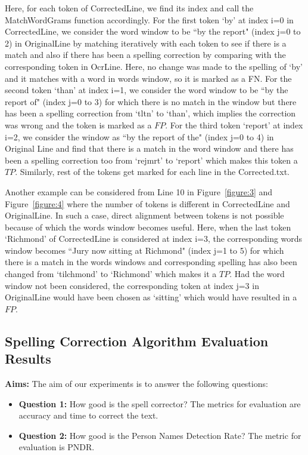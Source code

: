 \documentclass[letterpaper,11pt]{report}
\begin{document}
Here, for each token of CorrectedLine, we find its index and call the MatchWordGrams function accordingly. For the first token `by' at index i=0 in CorrectedLine, we consider the word window to be ``by the report" (index j=0 to 2) in OriginalLine by matching iteratively with each token to see if there is a match and also if there has been a spelling correction by comparing with the corresponding token in OcrLine. Here, no change was made to the spelling of `by' and it matches with a word in words window, so it is marked as a FN. For the second token `than' at index i=1, we consider the word window to be ``by the report of" (index j=0 to 3) for which there is no match in the window but there has been a spelling correction from `tltn' to `than', which implies the correction was wrong and the token is marked as a $FP$. For the third token `report' at index i=2, we consider the window as ``by the report of the" (index j=0 to 4) in Original Line and find that there is a match in the word window and there has been a spelling correction too from `rejmrt' to `report' which makes this token a $TP$. Similarly, rest of the tokens get marked for each line in the Corrected.txt. 

Another example can be considered from Line 10 in Figure~\ref{figure:3} and Figure~\ref{figure:4} where the number of tokens is different in CorrectedLine and OriginalLine. In such a case, direct alignment between tokens is not possible because of which the words window becomes useful. Here, when the last token `Richmond' of CorrectedLine is considered at index i=3, the corresponding words window becomes ``Jury now sitting at Richmond" (index j=1 to 5) for which there is a match in the words windows and corresponding spelling has also been changed from `tilchmond' to `Richmond' which makes it a $TP$. Had the word window not been considered, the corresponding token at index j=3 in OriginalLine would have been chosen as `sitting' which would have resulted in a $FP$. 
   


\subsection{Spelling Correction Algorithm Evaluation Results}
\label{spell:eval}

\noindent \textbf{Aims: }The aim of our experiments is to answer the following questions:
\begin{itemize}
\item \textbf{Question 1: }How good is the spell corrector? The metrics for evaluation are accuracy and time to correct the text.
 
\item \textbf{Question 2: }How good is the Person Names Detection Rate? The metric for evaluation is PNDR. 

\end{itemize}
\end{document}

